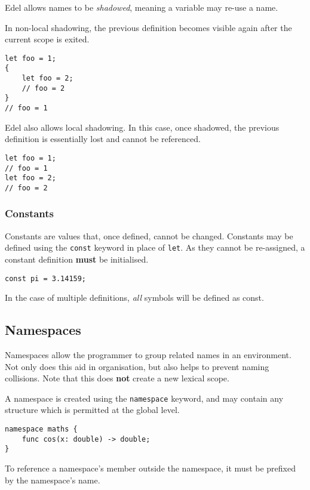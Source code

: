 Edel allows names to be \textit{shadowed}, meaning a variable may re-use a name.

In non-local shadowing, the previous definition becomes visible again after the current scope is exited.
\begin{lstlisting}[language=CustomLang]
let foo = 1;
{
    let foo = 2;
    // foo = 2
}
// foo = 1
\end{lstlisting}

Edel also allows local shadowing.
In this case, once shadowed, the previous definition is essentially lost and cannot be referenced.
\begin{lstlisting}[language=CustomLang]
let foo = 1;
// foo = 1
let foo = 2;
// foo = 2
\end{lstlisting}

\subsubsection{Constants}

Constants are values that, once defined, cannot be changed.
Constants may be defined using the \texttt{const} keyword in place of \texttt{let}.
As they cannot be re-assigned, a constant definition \textbf{must} be initialised.

\begin{lstlisting}[language=CustomLang]
const pi = 3.14159;
\end{lstlisting}

In the case of multiple definitions, \textit{all} symbols will be defined as const.

\subsection{Namespaces}

Namespaces allow the programmer to group related names in an environment.
Not only does this aid in organisation, but also helps to prevent naming collisions.
Note that this does \textbf{not} create a new lexical scope.

A namespace is created using the \texttt{namespace} keyword, and may contain any structure which is permitted at the global level.

\begin{lstlisting}[language=CustomLang]
namespace maths {
    func cos(x: double) -> double;
}
\end{lstlisting}

To reference a namespace's member outside the namespace, it must be prefixed by the namespace's name.

